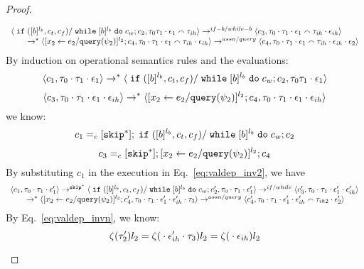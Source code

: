 \begin{proof}
\begin{case}[$\trace_2 = \trace_{ih} \cdot \event_{ih}$]
\begin{subcase}
\begin{equation}
\begin{array}{l}
  \langle \;\mathtt{if}\; ([b]^{l_b}, c_t, c_f) / \;\mathtt{while}\; [b]^{l_b} \;\mathtt{do}\; c_w;{c}_2, 
  \mathtt{\tau}_0 \mathtt{\tau}_1 \cdot \mathtt{\epsilon}_1 \smallfrown \mathtt{\tau}_{ih} \rangle 
 \rightarrow^{if-b / while-b} 
  \langle c_3, 
  \mathtt{\tau}_0 \cdot \mathtt{\tau}_1 \cdot \mathtt{\epsilon}_1 \smallfrown \mathtt{\tau}_{ih} \cdot \mathtt{\epsilon}_{ih} \rangle 
  \\
  \qquad   \rightarrow^{*} 
  \langle [\mathrel{ {x}_2 \leftarrow e_2 / {\tt query}(\psi_2) }]^{l_2};{c}_4, 
  \mathtt{\tau}_0 \cdot \mathtt{\tau}_1 \cdot \mathtt{\epsilon}_1 \smallfrown \mathtt{\tau}_{ih} \cdot \mathtt{\epsilon}_{ih} \rangle 
  \rightarrow^{assn/query} 
  \langle {c}_4,  \mathtt{\tau}_0 \cdot \mathtt{\tau}_1 \cdot \mathtt{\epsilon}_1  \smallfrown \mathtt{\tau}_{ih} \cdot \mathtt{\epsilon}_{ih} \cdot \mathtt{\epsilon}_2 \rangle 
\end{array}
\end{equation}
 By induction on operational semantics rules and the evaluations: 
 \[
  \langle c_1, \mathtt{\tau}_0 \cdot \mathtt{\tau}_1 \cdot \mathtt{\epsilon}_1 \rangle 
  \rightarrow^{*} 
  \langle \;\mathtt{if}\; ([b]^{l_b}, c_t, c_f) / \;\mathtt{while}\; [b]^{l_b} \;\mathtt{do}\; c_w;{c}_2, 
  \mathtt{\tau}_0 \mathtt{\tau}_1 \cdot \mathtt{\epsilon}_1 \rangle 
 \]
 \[
 \langle c_3, 
  \mathtt{\tau}_0 \cdot \mathtt{\tau}_1 \cdot \mathtt{\epsilon}_1 \cdot \mathtt{\epsilon}_{ih} \rangle 
  \rightarrow^{*} 
  \langle [\mathrel{ {x}_2 \leftarrow e_2 / {\tt query}(\psi_2) }]^{l_2};{c}_4, 
  \mathtt{\tau}_0 \cdot \mathtt{\tau}_1 \cdot \mathtt{\epsilon}_1 \cdot \mathtt{\epsilon}_{ih} \rangle 
 \]
 we know:
 \[
 c_1 =_c 
 [\mathtt{skip}^*]; \;\mathtt{if}\; ([b]^{l_b}, c_t, c_f) / \;\mathtt{while}\; [b]^{l_b} \;\mathtt{do}\; c_w;{c}_2
 \]
  \[
 c_3 =_c 
 [\mathtt{skip}^*]; [\mathrel{ {x}_2 \leftarrow e_2 / {\tt query}(\psi_2) }]^{l_2};{c}_4
 \]
By substituting $c_1$ in the execution in Eq.~\ref{eq:valdep_inv2}, we have 
\begin{equation}
\label{eq:m1test_inv2}
  \begin{array}{l}   
  \langle c_1, \mathtt{\tau}_0 \cdot \mathtt{\tau}_1 \cdot \mathtt{\epsilon}_1' \rangle 
  \rightarrow^{\mathtt{skip}^*} 
  \langle \;\mathtt{if}\; ([b]^{l_b}, c_t, c_f) / \;\mathtt{while}\; [b]^{l_b} \;\mathtt{do}\; c_w ; {c}_2', \mathtt{\tau}_0 \cdot \mathtt{\tau}_1 \cdot \mathtt{\epsilon}_1' \rangle 
  \rightarrow^{if / while} 
  \langle c_3', \mathtt{\tau}_0 \cdot \mathtt{\tau}_1 \cdot \mathtt{\epsilon}_1' \cdot \mathtt{\epsilon}_{ih}' \rangle 
  \\
  \qquad \rightarrow^{*} 
  \langle [\mathrel{ {x}_2 \leftarrow e_2 / {\tt query}(\psi_2) }]^{l_2};{c}_4', 
  \mathtt{\tau}_0 \cdot \mathtt{\tau}_1 \cdot \mathtt{\epsilon}_1' \cdot \mathtt{\epsilon}_{ih}' \cdot \mathtt{\tau}_3 \rangle
  \rightarrow^{assn/query} 
  \langle {c}_4',  \mathtt{\tau}_0 \cdot \mathtt{\tau}_1 \cdot \mathtt{\epsilon}_1' \cdot \mathtt{\epsilon}_{ih}' \smallfrown \mathtt{\tau}_{ih2} \cdot \mathtt{\epsilon}_2' \rangle 
\end{array}
\end{equation}
By Eq.~\ref{eq:valdep_invn}, we know:
%
\[
\mathtt{\zeta}(\mathtt{\tau}_2') l_2  = \mathtt{\zeta}({} \cdot {} \mathtt{\epsilon}_{ih}' \cdot \mathtt{\tau}_3) l_2 = \mathtt{\zeta}({} \cdot {} \mathtt{\epsilon}_{ih}) l_2 
\]
\end{subcase}
\end{case}
\end{proof}
